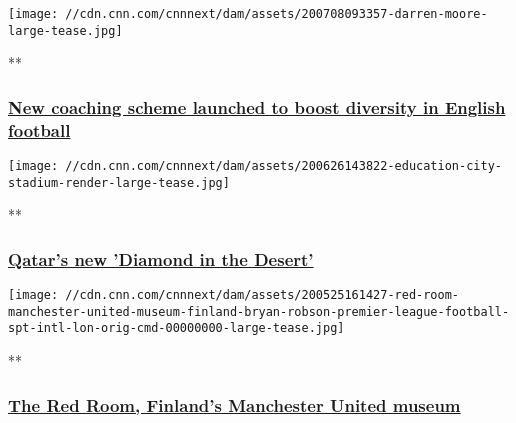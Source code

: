 \href{/videos/sports/2020/07/08/football-coaching-scheme-england-bame-raheem-sterling-black-lives-matter-spt-intl-gbr.cnn}{}

\texttt{[image: //cdn.cnn.com/cnnnext/dam/assets/200708093357-darren-moore-large-tease.jpg]}

**

\hypertarget{new-coaching-scheme-launched-to-boost-diversity-in-english-football}{%
\subsubsection{\texorpdfstring{\href{/videos/sports/2020/07/08/football-coaching-scheme-england-bame-raheem-sterling-black-lives-matter-spt-intl-gbr.cnn}{New
coaching scheme launched to boost diversity in English
football}}{New coaching scheme launched to boost diversity in English football}}\label{new-coaching-scheme-launched-to-boost-diversity-in-english-football}}

\href{/videos/sports/2020/06/26/education-city-stadium-qatar-2022-diamond-desert-world-cup-football-spt-intl-lon-orig.cnn}{}

\texttt{[image: //cdn.cnn.com/cnnnext/dam/assets/200626143822-education-city-stadium-render-large-tease.jpg]}

**

\hypertarget{qatars-new-diamond-in-the-desert}{%
\subsubsection{\texorpdfstring{\href{/videos/sports/2020/06/26/education-city-stadium-qatar-2022-diamond-desert-world-cup-football-spt-intl-lon-orig.cnn}{Qatar's
new 'Diamond in the
Desert'}}{Qatar's new 'Diamond in the Desert'}}\label{qatars-new-diamond-in-the-desert}}

\href{/videos/sports/2020/05/25/red-room-manchester-united-museum-finland-bryan-robson-premier-league-football-spt-intl-lon-orig-cmd.cnn}{}

\texttt{[image: //cdn.cnn.com/cnnnext/dam/assets/200525161427-red-room-manchester-united-museum-finland-bryan-robson-premier-league-football-spt-intl-lon-orig-cmd-00000000-large-tease.jpg]}

**

\hypertarget{the-red-room-finlands-manchester-united-museum}{%
\subsubsection{\texorpdfstring{\href{/videos/sports/2020/05/25/red-room-manchester-united-museum-finland-bryan-robson-premier-league-football-spt-intl-lon-orig-cmd.cnn}{The
Red Room, Finland's Manchester United
museum}}{The Red Room, Finland's Manchester United museum}}\label{the-red-room-finlands-manchester-united-museum}}

